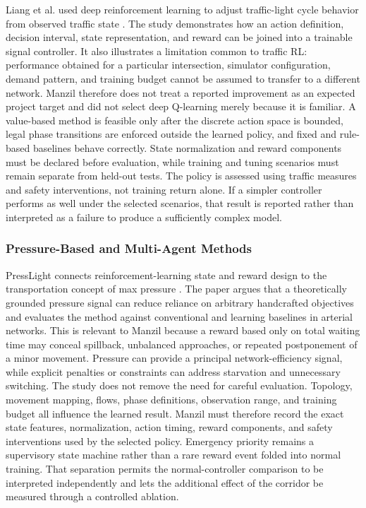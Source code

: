 Liang et al. used deep reinforcement learning to adjust traffic-light cycle behavior from observed traffic state \cite{liang2019dqn}. The study demonstrates how an action definition, decision interval, state representation, and reward can be joined into a trainable signal controller. It also illustrates a limitation common to traffic RL: performance obtained for a particular intersection, simulator configuration, demand pattern, and training budget cannot be assumed to transfer to a different network. Manzil therefore does not treat a reported improvement as an expected project target and did not select deep Q-learning merely because it is familiar. A value-based method is feasible only after the discrete action space is bounded, legal phase transitions are enforced outside the learned policy, and fixed and rule-based baselines behave correctly. State normalization and reward components must be declared before evaluation, while training and tuning scenarios must remain separate from held-out tests. The policy is assessed using traffic measures and safety interventions, not training return alone. If a simpler controller performs as well under the selected scenarios, that result is reported rather than interpreted as a failure to produce a sufficiently complex model.

\subsubsection{Pressure-Based and Multi-Agent Methods}

PressLight connects reinforcement-learning state and reward design to the transportation concept of max pressure \cite{wei2019presslight}. The paper argues that a theoretically grounded pressure signal can reduce reliance on arbitrary handcrafted objectives and evaluates the method against conventional and learning baselines in arterial networks. This is relevant to Manzil because a reward based only on total waiting time may conceal spillback, unbalanced approaches, or repeated postponement of a minor movement. Pressure can provide a principal network-efficiency signal, while explicit penalties or constraints can address starvation and unnecessary switching. The study does not remove the need for careful evaluation. Topology, movement mapping, flows, phase definitions, observation range, and training budget all influence the learned result. Manzil must therefore record the exact state features, normalization, action timing, reward components, and safety interventions used by the selected policy. Emergency priority remains a supervisory state machine rather than a rare reward event folded into normal training. That separation permits the normal-controller comparison to be interpreted independently and lets the additional effect of the corridor be measured through a controlled ablation.

